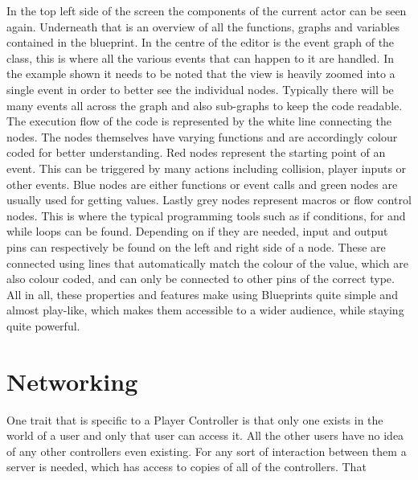 In the top left side of the screen the components of the current actor can be seen again. Underneath that is an overview of all the functions, graphs and variables contained in the blueprint. In the centre of the editor is the event graph of the class, this is where all the various events that can happen to it are handled. In the example shown it needs to be noted that the view is heavily zoomed into a single event in order to better see the individual nodes. Typically there will be many events all across the graph and also sub-graphs to keep the code readable.\\
The execution flow of the code is represented by the white line connecting the nodes. The nodes themselves have varying functions and are accordingly colour coded for better understanding. Red nodes represent the starting point of an event. This can be triggered by many actions including collision, player inputs or other events. Blue nodes are either functions or event calls and green nodes are usually used for getting values. Lastly grey nodes represent macros or flow control nodes. This is where the typical programming tools such as if conditions, for and while loops can be found.
Depending on if they are needed, input and output pins can respectively be found on the left and right side of a node. These are connected using lines that automatically match the colour of the value, which are also colour coded, and can only be connected to other pins of the correct type.\\
All in all, these properties and features make using Blueprints quite simple and almost play-like, which makes them accessible to a wider audience, while staying quite powerful.

\section{Networking}

One trait that is specific to a Player Controller is that only one exists in the world of a user and only that user can access it. All the other users have no idea of any other controllers even existing. For any sort of interaction between them a server is needed, which has access to copies of all of the controllers. That 
